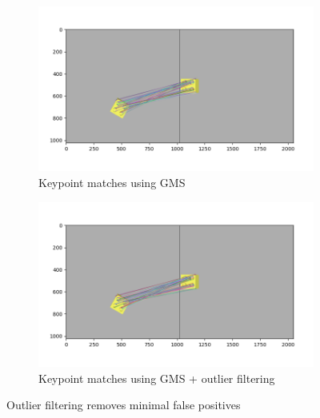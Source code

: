 \begin{figure}[h]
    \centering
    \begin{subfigure}[t]{0.49\textwidth}
        \includegraphics[width=\textwidth]{figures/inliers-gms.png}
        \caption{Keypoint matches using GMS}
        \label{fig:inliers-gms}
    \end{subfigure}
    \hfill
    \begin{subfigure}[t]{0.49\textwidth}
        \includegraphics[width=\textwidth]{figures/inliers-gms+ours.png}
        \caption{Keypoint matches using GMS + outlier filtering}
        \label{fig:inliers-gms+filter}
    \end{subfigure}
    \caption{Outlier filtering removes minimal false positives}
    \label{fig:consensus-filtering2}
\end{figure}

